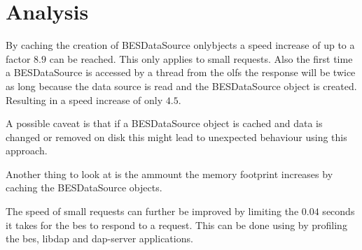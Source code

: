 \documentclass{article}
\begin{document}
\section{Analysis}
By caching the creation of BESDataSource onlybjects a speed increase of up to a factor $8.9$ can be reached. This only applies to small requests. Also the first time a BESDataSource is accessed by a thread from the olfs the response will be twice as long because the data source is read and the BESDataSource object is created. Resulting in a speed increase of only $4.5$. 

A possible caveat is that if a BESDataSource object is cached and data is changed or removed on disk this might lead to unexpected behaviour using this approach. 

Another thing to look at is the ammount the memory footprint increases by caching the BESDataSource objects.

The speed of small requests can further be improved by limiting the $0.04$ seconds it takes for the bes to respond to a request. This can be done using by profiling the bes, libdap and dap-server applications. 
\end{document}
